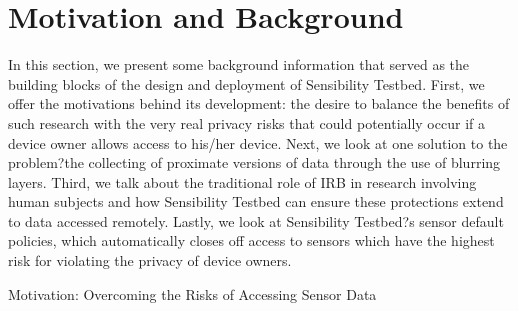\section{Motivation and Background}\label{sec-motivation}


 In this section, we present some background information that served as the building blocks of the  design and deployment of Sensibility Testbed. First, we offer the motivations behind its development: the desire to balance the benefits of such research with the very real privacy risks that could potentially occur if a device owner allows access to his/her device. Next, we look at one solution to the problem?the collecting of proximate versions of data through the use of blurring layers. Third, we talk about the traditional role of IRB in research involving human subjects and how Sensibility Testbed can ensure these protections extend to data accessed remotely. Lastly, we look at Sensibility Testbed?s sensor default policies, which automatically closes off access to sensors which have the highest risk for violating the privacy of device owners.


Motivation: Overcoming the Risks of Accessing Sensor Data

